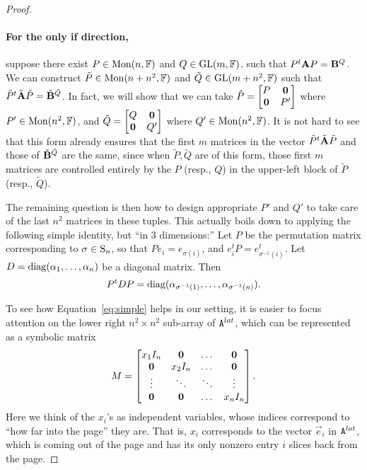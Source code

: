 \documentclass[11pt]{article}
\begin{document}
\begin{proof}
\paragraph{For the only if direction,} suppose there exist $P\in \Mon(n, 
\F)$ and 
$Q\in \GL(m, \F)$, 
such that $P^t\vA P=\vB^Q$. We can construct $\tilde P\in \Mon(n+n^2, \F)$ 
and $\tilde 
Q\in \GL(m+n^2, \F)$ such that $\tilde P^t\tilde\vA\tilde P=\tilde\vB^{\tilde Q}$. In 
fact, we will show that we can take $\tilde P=\begin{bmatrix} P & \vzero \\ \vzero & 
P'\end{bmatrix}$ where $P'\in \Mon(n^2, \F)$, and $\tilde 
Q=\begin{bmatrix} Q & \vzero 
\\ \vzero & Q'\end{bmatrix}$ where $Q'\in \Mon(n^2, \F)$. It is not hard 
to see 
that this form already ensures that the first $m$ matrices in the vector $\tilde 
P^t\tilde\vA\tilde P$ and those of $\tilde \vB^{\tilde Q}$ are the same, 
since when $\tilde P, \tilde Q$ are of this form, those first $m$ matrices are 
controlled entirely by the $P$ (resp., $Q$) in the upper-left block of $\tilde P$ 
(resp., $\tilde Q$).

The remaining question is then how to design appropriate $P'$ and $Q'$ to take 
care of the last $n^2$ matrices in these tuples. This actually boils down to applying
the following simple identity, but ``in 3 dimensions:'' Let $P$ be the permutation matrix 
corresponding to 
$\sigma\in \S_n$, so that $Pe_i=e_{\sigma(i)}$, and $e_i^tP=e_{\sigma^{-1}(i)}^t$. 
Let $D=\diag(\alpha_1, \dots, \alpha_n)$ be a diagonal matrix. Then 
\begin{equation}\label{eq:simple}
P^tDP=\diag(\alpha_{\sigma^{-1}(1)}, \dots, \alpha_{\sigma^{-1}(n)}).
\end{equation}

To see how Equation~\ref{eq:simple} helps in our 
setting, it is easier to focus attention on the lower right $n^2\times n^2$ sub-array of 
$\tA^{lat}$, which can be represented as a symbolic matrix
$$
M=\begin{bmatrix}
x_1 I_n & \vzero & \dots & \vzero \\
\vzero & x_2 I_n & \dots & \vzero \\
\vdots & \ddots & \ddots & \vdots \\
\vzero & \vzero & \dots & x_n I_n
\end{bmatrix}.
$$
Here we think of the $x_i$'s as independent variables, whose indices correspond to ``how far into the page'' they are. That is, $x_i$ corresponds to the vector $\vec{e}_i$ in $\tA^{lat}$, which is coming out of the page and has its only nonzero entry $i$ slices back from the page. 


\end{proof}
\end{document}
